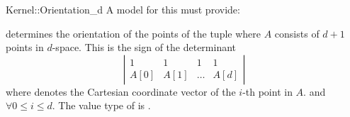 \begin{ccRefFunctionObjectConcept}{Kernel::Orientation_d}
A model for this must provide:


{determines the orientation of the points of the tuple
 \ccc{A = tuple [first,last)} where $A$ consists of $d + 1$ points in
 $d$-space. This is the sign of the determinant
  \[ \left| \begin{array}{cccc}
  1 & 1 & 1 & 1 \\
  A[0] & A[1] & \dots & A[d]
  \end{array}  \right|  \]
  where  denotes the Cartesian coordinate vector of
  the $i$-th point in $A$.
  \ccPrecond \ccc{size [first,last) == d+1} and
   $\forall 0 \leq i \leq d$.
  \ccRequire The value type of  is
  .  }

\end{ccRefFunctionObjectConcept}
